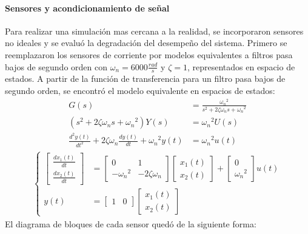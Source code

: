 \documentclass[a4paper, 10pt, onecolumn,journal]{ieeeconf}
\begin{document}
\paragraph{\textbf{Sensores y acondicionamiento de señal}} 
Para realizar una simulación mas cercana a la realidad, se incorporaron sensores no ideales y se evaluó la degradación del desempeño del sistema.
Primero se reemplazaron los sensores de corriente por modelos equivalentes a filtros pasa bajos de segundo orden con $\omega_n=6000\frac{rad}{s}$ y $\zeta = 1$, representados en espacio de estados.
A partir de la función de transferencia para un filtro pasa bajos de segundo orden, se encontró el modelo equivalente en espacios de estados:
\begin{align}
	G(s) &= \frac{{\omega_n}^2}{s^2 + 2 \zeta \omega_n s + {\omega_n}^2}\\
	\left(s^2 + 2 \zeta \omega_n s + {\omega_n}^2 \right) Y(s)&={\omega_n}^2 U(s)\\
	\frac{d^2 y(t)}{dt^2} + 2 \zeta \omega_n \frac{d y(t)}{dt} + {\omega_n}^2 y(t) &= {\omega_n}^2 u(t) 
\end{align}
\begin{align}
	\begin{cases}
		\begin{bmatrix}
			\frac{d x_1(t)}{dt} \\ 
			\frac{d x_2(t)}{dt}
		\end{bmatrix} &= 
		\begin{bmatrix}
			0 & 1 \\ 
			-{\omega_n}^2 & - 2 \zeta \omega_n
		\end{bmatrix}
		\begin{bmatrix}
			x_1(t) \\ 
			x_2(t)
		\end{bmatrix} + 
		\begin{bmatrix}
			0 \\
			{\omega_n}^2
		\end{bmatrix} u(t) \\
		y(t) &= \begin{bmatrix}
			1 & 0
		\end{bmatrix} 
		\begin{bmatrix}
			x_1(t) \\ 
			x_2(t)
		\end{bmatrix}
	\end{cases}\label{ecuacion matricial de sensor corriente}
\end{align}
El diagrama de bloques de cada sensor quedó de la siguiente forma:
\end{document}
